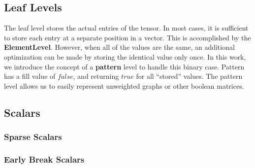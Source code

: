 
\subsection{Leaf Levels}

The leaf level stores the actual entries of the tensor. In most cases, it is
sufficient to store each entry at a separate position in a vector. This is accomplished by the \textbf{ElementLevel}. However, when all of the
values are the same, an additional optimization can be made by storing the
identical value only once. In this work, we introduce the concept of a \textbf{pattern}
level to handle this binary case. Pattern has a fill value of $false$, and returning $true$ for all ``stored'' values. The pattern level allows us to easily represent unweighted graphs or other boolean matrices.

\subsection{Scalars}

\subsubsection{Sparse Scalars}
\subsubsection{Early Break Scalars}

